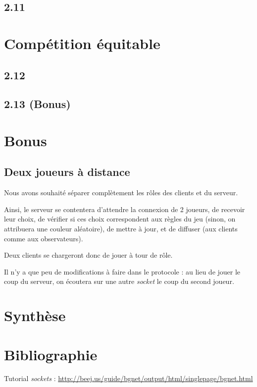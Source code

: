 \documentclass[12pt]{article}
\def\question#1{\subsection{#1}}
\def\sec#1{\section{#1}}
\begin{document}

\question{2.11}

\sec{Compétition équitable}
\question{2.12}
\question{2.13 (Bonus)}

\sec{Bonus}
\question{Deux joueurs à distance}
Nous avons souhaité séparer complètement les rôles des clients et du serveur.

Ainsi, le serveur se contentera d'attendre la connexion de 2 joueurs, de recevoir leur choix, de vérifier si ces choix correspondent aux règles du jeu (sinon, on attribuera une couleur aléatoire), de mettre à jour, et de diffuser (aux clients comme aux observateurs).

Deux clients se chargeront donc de jouer à tour de rôle.

Il n'y a que peu de modifications à faire dans le protocole : au lieu de jouer le coup du serveur, on écoutera sur une autre \textit{socket} le coup du second joueur.

\sec{Synthèse}

\sec{Bibliographie}
Tutorial \textit{sockets} : \url{http://beej.us/guide/bgnet/output/html/singlepage/bgnet.html}
\end{document}
